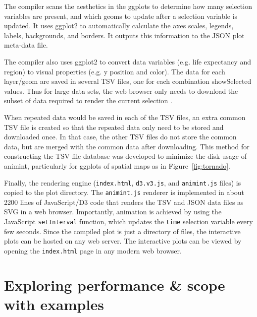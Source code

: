 \documentclass[journal]{vgtc}\usepackage[]{graphicx}\usepackage[]{color}
\begin{document}
The compiler scans the aesthetics in the ggplots to determine
how many selection variables are present, and which geoms to update
after a selection variable is updated. It uses ggplot2 to
automatically calculate the axes scales, legends, labels, backgrounds,
and borders. It outputs this information to the JSON plot meta-data
file.

The compiler also uses ggplot2 to convert data variables (e.g. life
expectancy and region) to visual properties (e.g. y position and
color). The data for each layer/geom are saved in several TSV files,
one for each combination showSelected values. Thus for large data
sets, the web browser only needs to download the subset of data
required to render the current selection \citep{2013-immens}.

When repeated data would be saved in each of the TSV files, an extra
common TSV file is created so that the repeated data only need to be
stored and downloaded once. In that case, the other TSV files do not
store the common data, but are merged with the common data after
downloading. This method for constructing the TSV file database was
developed to minimize the disk usage of animint, particularly
for ggplots of spatial maps as in Figure~\ref{fig:tornado}.

Finally, the rendering engine (\texttt{index.html}, \texttt{d3.v3.js},
and \texttt{animint.js} files) is copied to the plot directory. The
\texttt{animint.js} renderer is implemented in about 2200 lines of
JavaScript/D3 code that renders the TSV and JSON data files as SVG in
a web browser. Importantly, animation is achieved by using the
JavaScript \texttt{setInterval} function, which updates the
\texttt{time} selection variable every few seconds. Since the compiled
plot is just a directory of files, the interactive plots can be hosted
on any web server. The interactive plots can be viewed by opening the
\texttt{index.html} page in any modern web browser.

\section{Exploring performance \& scope with examples}
\label{sec:performance}
\end{document}

